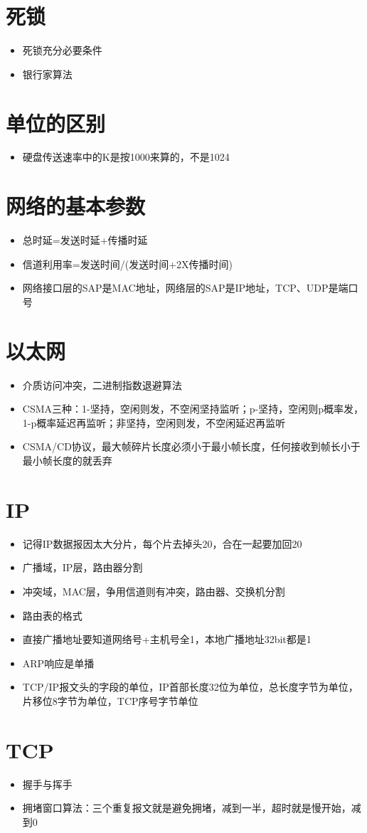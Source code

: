 \documentclass[UTF8]{ctexart}
\begin{document}
\section{死锁}
\begin{itemize}
	\item 死锁充分必要条件
	\item 银行家算法
\end{itemize}

\section{单位的区别}
\begin{itemize}
	\item 硬盘传送速率中的K是按1000来算的，不是1024
\end{itemize}


\section{网络的基本参数}
\begin{itemize}
	\item 总时延=发送时延+传播时延
	\item 信道利用率=发送时间/(发送时间+2X传播时间)
	\item 网络接口层的SAP是MAC地址，网络层的SAP是IP地址，TCP、UDP是端口号
\end{itemize}

\section{以太网}
\begin{itemize}
	\item 介质访问冲突，二进制指数退避算法
	\item CSMA三种：1-坚持，空闲则发，不空闲坚持监听；p-坚持，空闲则p概率发，1-p概率延迟再监听；非坚持，空闲则发，不空闲延迟再监听
	\item CSMA/CD协议，最大帧碎片长度必须小于最小帧长度，任何接收到帧长小于最小帧长度的就丢弃
\end{itemize}

\section{IP}
\begin{itemize}
	\item 记得IP数据报因太大分片，每个片去掉头20，合在一起要加回20
	\item 广播域，IP层，路由器分割
	\item 冲突域，MAC层，争用信道则有冲突，路由器、交换机分割
	\item 路由表的格式
	\item 直接广播地址要知道网络号+主机号全1，本地广播地址32bit都是1
	\item ARP响应是单播
	\item TCP/IP报文头的字段的单位，IP首部长度32位为单位，总长度字节为单位，片移位8字节为单位，TCP序号字节单位
\end{itemize}

\section{TCP}
\begin{itemize}
	\item 握手与挥手

	\item 拥堵窗口算法：三个重复报文就是避免拥堵，减到一半，超时就是慢开始，减到0
\end{itemize}
\end{document}
